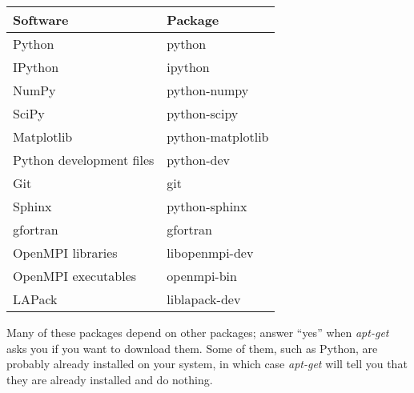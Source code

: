 \documentclass[letterpaper,10pt,english]{sphinxmanual}
\begin{document}
\begin{tabulary}{\linewidth}{|L|L|}
\hline
\textsf{\relax 
Software
} & \textsf{\relax 
Package
}\\
\hline
Python
 & 
python
\\
\hline
IPython
 & 
ipython
\\
\hline
NumPy
 & 
python-numpy
\\
\hline
SciPy
 & 
python-scipy
\\
\hline
Matplotlib
 & 
python-matplotlib
\\
\hline
Python development files
 & 
python-dev
\\
\hline
Git
 & 
git
\\
\hline
Sphinx
 & 
python-sphinx
\\
\hline
gfortran
 & 
gfortran
\\
\hline
OpenMPI libraries
 & 
libopenmpi-dev
\\
\hline
OpenMPI executables
 & 
openmpi-bin
\\
\hline
LAPack
 & 
liblapack-dev
\\
\hline\end{tabulary}


Many of these packages depend on other packages; answer ``yes'' when
\emph{apt-get} asks you if you want to download them.  Some of them, such
as Python, are probably already installed on your system, in which
case \emph{apt-get} will tell you that they are already installed and do
nothing.
\end{document}
